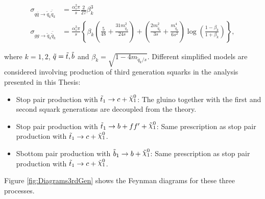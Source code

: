 \begin{equation}
\begin{split}
\sigma_{q\bar{q} \rightarrow \tilde{q}_k\bar{\tilde{q}}_k} &= \frac{\alpha_s^2 \pi}{s} \frac{2}{27} \beta_k^3 \\
\sigma_{gg \rightarrow \tilde{q}_k \bar{\tilde{q}}_k} &= \frac{\alpha_s^2 \pi}{s} \left\{ \beta_k \left( \frac{5}{48} + \frac{31 m_{\tilde{q}_k}^2}{24s}\right) + \left(\frac{2m_{\tilde{q}_k}^2}{3s} + \frac{m_{\tilde{q}_k}^4}{6s^2}\right)\log{\left(\frac{1-\beta_k}{1+\beta_k}\right)} \right\} ,
\end{split}
\label{eq:StopSbottomCrossSection}
\end{equation}

\noindent where $k=1, 2$, $\tilde{q} = \tilde{t}, \tilde{b}$ and $\beta_k = \sqrt{1 - 4m_{\tilde{q}_k/s}}$.
Different simplified models are considered involving production of third generation squarks in the analysis presented in this Thesis:

\begin{itemize}
\item{Stop pair production with $\stoptocharm$:} The gluino together with the first and second squark generations are decoupled from the theory.
\item{Stop pair production with $\stopfourbody$:} Same prescription as stop pair production with $\stoptocharm$.
\item{Sbottom pair production with $\sbottomtob$:} Same prescription as stop pair production with $\stoptocharm$.
\end{itemize}

Figure \ref{fig:Diagrams3rdGen} shows the Feynman diagrams for these three processes.

